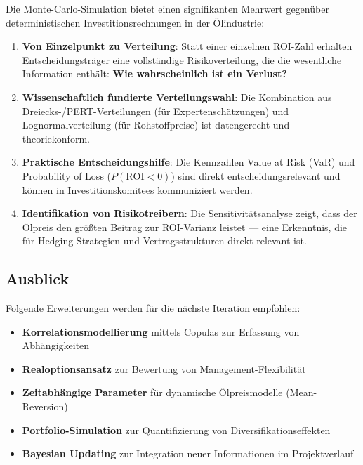 \documentclass[12pt,a4paper]{article}
\begin{document}
Die Monte-Carlo-Simulation bietet einen signifikanten Mehrwert gegenüber deterministischen Investitionsrechnungen in der Ölindustrie:

\begin{enumerate}[label=\arabic*., itemsep=4pt]
  \item \textbf{Von Einzelpunkt zu Verteilung}: Statt einer einzelnen ROI-Zahl erhalten Entscheidungsträger eine vollständige Risikoverteilung, die die wesentliche Information enthält: \textbf{Wie wahrscheinlich ist ein Verlust?}
  \item \textbf{Wissenschaftlich fundierte Verteilungswahl}: Die Kombination aus Dreiecks-/PERT-Verteilungen (für Expertenschätzungen) und Lognormalverteilung (für Rohstoffpreise) ist datengerecht und theoriekonform.
  \item \textbf{Praktische Entscheidungshilfe}: Die Kennzahlen Value at Risk (VaR) und Probability of Loss ($P(\text{ROI} < 0)$) sind direkt entscheidungsrelevant und können in Investitionskomitees kommuniziert werden.
  \item \textbf{Identifikation von Risikotreibern}: Die Sensitivitätsanalyse zeigt, dass der Ölpreis den größten Beitrag zur ROI-Varianz leistet — eine Erkenntnis, die für Hedging-Strategien und Vertragsstrukturen direkt relevant ist.
\end{enumerate}

\subsection{Ausblick}

Folgende Erweiterungen werden für die nächste Iteration empfohlen:

\begin{itemize}[itemsep=2pt]
  \item \textbf{Korrelationsmodellierung} mittels Copulas zur Erfassung von Abhängigkeiten
  \item \textbf{Realoptionsansatz} zur Bewertung von Management-Flexibilität
  \item \textbf{Zeitabhängige Parameter} für dynamische Ölpreismodelle (Mean-Reversion)
  \item \textbf{Portfolio-Simulation} zur Quantifizierung von Diversifikationseffekten
  \item \textbf{Bayesian Updating} zur Integration neuer Informationen im Projektverlauf
\end{itemize}
\end{document}
